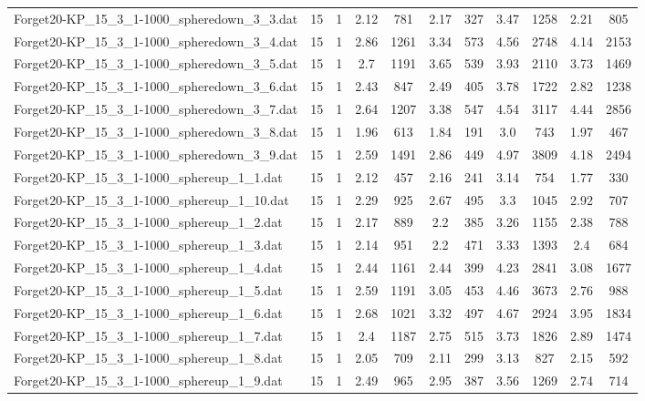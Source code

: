 \begin{table}[!ht]
\begin{tabular}{lcccccccccc}
Forget20-KP\_15\_3\_1-1000\_spheredown\_3\_3.dat & 15 & 1 & 2.12 & 781 & 2.17 & 327 & 3.47 & 1258 & 2.21 & 805 \\
Forget20-KP\_15\_3\_1-1000\_spheredown\_3\_4.dat & 15 & 1 & 2.86 & 1261 & 3.34 & 573 & 4.56 & 2748 & 4.14 & 2153 \\
Forget20-KP\_15\_3\_1-1000\_spheredown\_3\_5.dat & 15 & 1 & 2.7 & 1191 & 3.65 & 539 & 3.93 & 2110 & 3.73 & 1469 \\
Forget20-KP\_15\_3\_1-1000\_spheredown\_3\_6.dat & 15 & 1 & 2.43 & 847 & 2.49 & 405 & 3.78 & 1722 & 2.82 & 1238 \\
Forget20-KP\_15\_3\_1-1000\_spheredown\_3\_7.dat & 15 & 1 & 2.64 & 1207 & 3.38 & 547 & 4.54 & 3117 & 4.44 & 2856 \\
Forget20-KP\_15\_3\_1-1000\_spheredown\_3\_8.dat & 15 & 1 & 1.96 & 613 & 1.84 & 191 & 3.0 & 743 & 1.97 & 467 \\
Forget20-KP\_15\_3\_1-1000\_spheredown\_3\_9.dat & 15 & 1 & 2.59 & 1491 & 2.86 & 449 & 4.97 & 3809 & 4.18 & 2494 \\
Forget20-KP\_15\_3\_1-1000\_sphereup\_1\_1.dat & 15 & 1 & 2.12 & 457 & 2.16 & 241 & 3.14 & 754 & 1.77 & 330 \\
Forget20-KP\_15\_3\_1-1000\_sphereup\_1\_10.dat & 15 & 1 & 2.29 & 925 & 2.67 & 495 & 3.3 & 1045 & 2.92 & 707 \\
Forget20-KP\_15\_3\_1-1000\_sphereup\_1\_2.dat & 15 & 1 & 2.17 & 889 & 2.2 & 385 & 3.26 & 1155 & 2.38 & 788 \\
Forget20-KP\_15\_3\_1-1000\_sphereup\_1\_3.dat & 15 & 1 & 2.14 & 951 & 2.2 & 471 & 3.33 & 1393 & 2.4 & 684 \\
Forget20-KP\_15\_3\_1-1000\_sphereup\_1\_4.dat & 15 & 1 & 2.44 & 1161 & 2.44 & 399 & 4.23 & 2841 & 3.08 & 1677 \\
Forget20-KP\_15\_3\_1-1000\_sphereup\_1\_5.dat & 15 & 1 & 2.59 & 1191 & 3.05 & 453 & 4.46 & 3673 & 2.76 & 988 \\
Forget20-KP\_15\_3\_1-1000\_sphereup\_1\_6.dat & 15 & 1 & 2.68 & 1021 & 3.32 & 497 & 4.67 & 2924 & 3.95 & 1834 \\
Forget20-KP\_15\_3\_1-1000\_sphereup\_1\_7.dat & 15 & 1 & 2.4 & 1187 & 2.75 & 515 & 3.73 & 1826 & 2.89 & 1474 \\
Forget20-KP\_15\_3\_1-1000\_sphereup\_1\_8.dat & 15 & 1 & 2.05 & 709 & 2.11 & 299 & 3.13 & 827 & 2.15 & 592 \\
Forget20-KP\_15\_3\_1-1000\_sphereup\_1\_9.dat & 15 & 1 & 2.49 & 965 & 2.95 & 387 & 3.56 & 1269 & 2.74 & 714 \\

\end{tabular}
\end{table}
